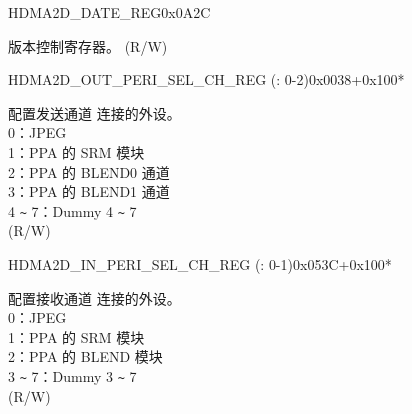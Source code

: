 \begin{register}{H}{DMA2D\_DATE\_REG}{0x0A2C}\label{regdesc:DMA2DDATEREG}
%
\regnewline%
\begin{regdesc}\begin{reglist}
\label{fielddesc:DMA2DDATE}\item [DMA2D\_DATE] 版本控制寄存器。 (R/W)
\end{reglist}\end{regdesc}
\end{register}


\begin{register}{H}{DMA2D\_OUT\_PERI\_SEL\_CH\_REG (: 0-2)}{0x0038+0x100*}\label{regdesc:DMA2DOUTPERISELCHNREG}
%
%
\regnewline%
\begin{regdesc}\begin{reglist}
\label{fielddesc:DMA2DOUTPERISELCHN}\item [DMA2D\_OUT\_PERI\_SEL\_CH\regindex{n}] 配置发送通道  连接的外设。\\
0：JPEG\\
1：PPA 的 SRM 模块\\
2：PPA 的 BLEND0 通道\\
3：PPA 的 BLEND1 通道\\
4 \verb+~+ 7：Dummy 4 \verb+~+ 7\\ (R/W)
\end{reglist}\end{regdesc}
\end{register}


\begin{register}{H}{DMA2D\_IN\_PERI\_SEL\_CH\_REG (: 0-1)}{0x053C+0x100*}\label{regdesc:DMA2DINPERISELCHNREG}
%
%
\regnewline%
\begin{regdesc}\begin{reglist}
\label{fielddesc:DMA2DINPERISELCHN}\item [DMA2D\_IN\_PERI\_SEL\_CH\regindex{n}] 配置接收通道  连接的外设。\\
0：JPEG\\
1：PPA 的 SRM 模块\\
2：PPA 的 BLEND 模块\\
3 \verb+~+ 7：Dummy 3 \verb+~+ 7\\ (R/W)
\end{reglist}\end{regdesc}
\end{register}
